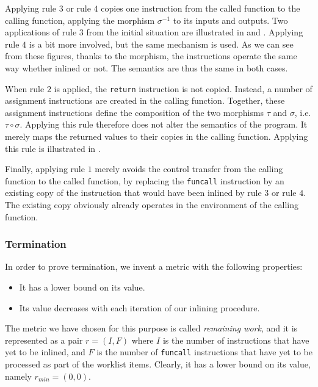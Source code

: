 Applying rule $3$ or rule $4$ copies one instruction from the called
function to the calling function, applying the morphism $\sigma^{-1}$
to its inputs and outputs.  Two applications of rule $3$ from the
initial situation are illustrated in  and
.  Applying rule $4$ is a bit more involved, but
the same mechanism is used.  As we can see from these figures, thanks
to the morphism, the instructions operate the same way whether inlined
or not.  The semantics are thus the same in both cases.

When rule $2$ is applied, the \texttt{return} instruction is not
copied.  Instead, a number of assignment instructions are created in
the calling function.  Together, these assignment instructions define
the composition of the two morphisms $\tau$ and $\sigma$, i.e. $\tau
\circ \sigma$.  Applying this rule therefore does not alter the
semantics of the program.  It merely maps the returned values to their
copies in the calling function.  Applying this rule is illustrated in
.

Finally, applying rule $1$ merely avoids the control transfer from the
calling function to the called function, by replacing the
\texttt{funcall} instruction by an existing copy of the instruction
that would have been inlined by rule $3$ or rule $4$.  The existing
copy obviously already operates in the environment of the calling
function.

\subsubsection{Termination}

In order to prove termination, we invent a metric with the following
properties:

\begin{itemize}
\item It has a lower bound on its value.
\item Its value decreases with each iteration of our inlining
  procedure.
\end{itemize}

The metric we have chosen for this purpose is called \emph{remaining
  work}, and it is represented as a pair $r = (I,F)$ where $I$ is the
number of instructions that have yet to be inlined, and $F$ is the
number of \texttt{funcall} instructions that have yet to be processed
as part of the worklist items.  Clearly, it has a lower bound on its
value, namely $r_{min} = (0,0)$.

